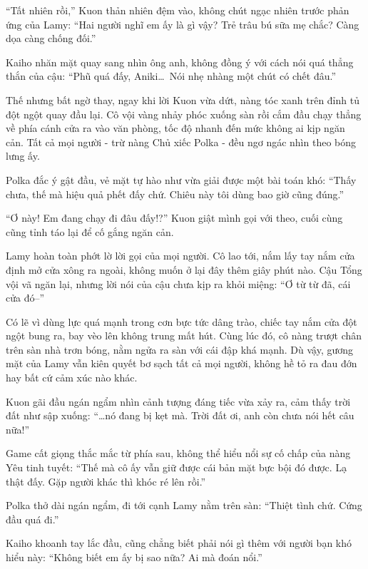 \documentclass[../main.tex]{subfiles}
\begin{document}
``Tất nhiên rồi,'' Kuon thản nhiên đệm vào, không chút ngạc nhiên trước phản ứng của Lamy: ``Hai người nghĩ em ấy là gì vậy? Trẻ trâu bú sữa mẹ chắc? Càng dọa càng chống đối.''

Kaiho nhăn mặt quay sang nhìn ông anh, không đồng ý với cách nói quá thẳng thắn của cậu: ``Phũ quá đấy, Aniki\dots\ Nói nhẹ nhàng một chút có chết đâu.''

Thế nhưng bất ngờ thay, ngay khi lời Kuon vừa dứt, nàng tóc xanh trên đỉnh tủ đột ngột quay đầu lại. Cô vội vàng nhảy phóc xuống sàn rồi cắm đầu chạy thẳng về phía cánh cửa ra vào văn phòng, tốc độ nhanh đến mức không ai kịp ngăn cản. Tất cả mọi người - trừ nàng Chủ xiếc Polka - đều ngơ ngác nhìn theo bóng lưng ấy.

Polka đắc ý gật đầu, vẻ mặt tự hào như vừa giải được một bài toán khó: ``Thấy chưa, thế mà hiệu quả phết đấy chứ. Chiêu này tôi dùng bao giờ cũng đúng.''

``Ơ này! Em đang chạy đi đâu đấy!?'' Kuon giật mình gọi với theo, cuối cùng cũng tỉnh táo lại để cố gắng ngăn cản.

Lamy hoàn toàn phớt lờ lời gọi của mọi người. Cô lao tới, nắm lấy tay nắm cửa định mở cửa xông ra ngoài, không muốn ở lại đây thêm giây phút nào. Cậu Tổng vội vã ngăn lại, nhưng lời nói của cậu chưa kịp ra khỏi miệng: ``Ơ từ từ đã, cái cửa đó--''

Có lẽ vì dùng lực quá mạnh trong cơn bực tức dâng trào, chiếc tay nắm cửa đột ngột bung ra, bay vèo lên không trung mất hút. Cùng lúc đó, cô nàng trượt chân trên sàn nhà trơn bóng, nằm ngửa ra sàn với cái đập khá mạnh. Dù vậy, gương mặt của Lamy vẫn kiên quyết bơ sạch tất cả mọi người, không hề tỏ ra đau đớn hay bất cứ cảm xúc nào khác.


Kuon gãi đầu ngán ngẩm nhìn cảnh tượng đáng tiếc vừa xảy ra, cảm thấy trời đất như sập xuống: ``\dots nó đang bị kẹt mà. Trời đất ơi, anh còn chưa nói hết câu nữa!''

Game cất giọng thắc mắc từ phía sau, không thể hiểu nổi sự cố chấp của nàng Yêu tinh tuyết: ``Thế mà cô ấy vẫn giữ được cái bản mặt bực bội đó được. Lạ thật đấy. Gặp người khác thì khóc ré lên rồi.''

Polka thở dài ngán ngẩm, đi tới cạnh Lamy nằm trên sàn: ``Thiệt tình chứ. Cứng đầu quá đi.''

Kaiho khoanh tay lắc đầu, cũng chẳng biết phải nói gì thêm với người bạn khó hiểu này: ``Không biết em ấy bị sao nữa? Ai mà đoán nổi.''
\end{document}
